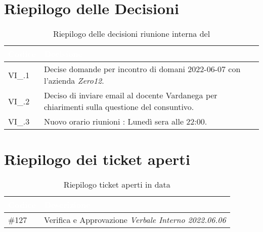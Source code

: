\section{Riepilogo delle Decisioni}


\begin{table}[!htbp]
    \renewcommand{\arraystretch}{1.5}
    \begin{tabular}{m{}<{\centering}  m{}<{\centering}}
        \rowcolor{darkblue} \textcolor{white}{\textbf{Codice}} & \textcolor{white}{\textbf{Decisione}}                        \\
        \hline
        VI\_{}\D{}.1                                            & Decise domande per incontro di domani 2022-06-07 con l'azienda \textit{Zero12}. \\ 
        VI\_{}\D{}.2                                           & Deciso di inviare email al docente Vardanega per chiarimenti sulla questione del consuntivo. \\
        VI\_{}\D{}.3                                            & Nuovo orario riunioni : Lunedì sera alle 22:00. \\ 
    \end{tabular}
    \caption{Riepilogo delle decisioni riunione interna del \D}
\end{table}

\section{Riepilogo dei ticket aperti}

\begin{table}[!htbp]
    \renewcommand{\arraystretch}{1.5}
    \begin{tabular}{m{}<{\centering}  m{}<{\centering}}
        \rowcolor{darkblue} \textcolor{white}{\textbf{Codice}} & \textcolor{white}{\textbf{Descrizione}}                        \\
        \hline
        \#{127}										  & Verifica e Approvazione \textit{Verbale Interno 2022.06.06} \\
    \end{tabular}
    \caption{Riepilogo ticket aperti in data \D}
\end{table}